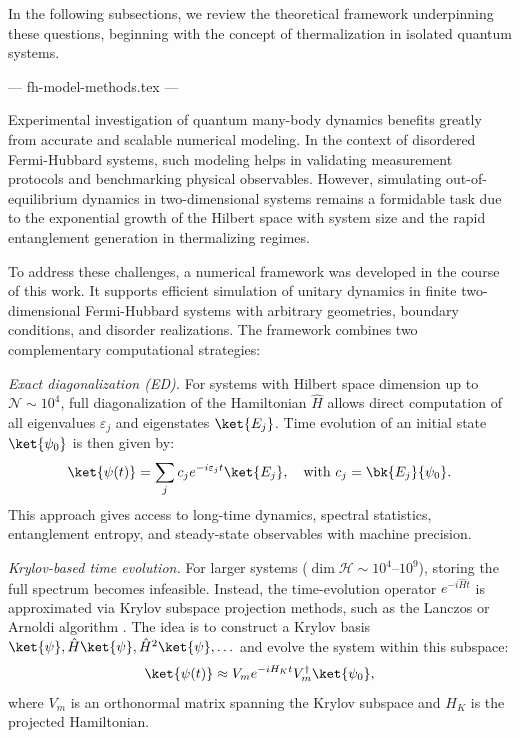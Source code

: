 In the following subsections, we review the theoretical framework underpinning these questions, beginning with the concept of thermalization in isolated quantum systems.



--- fh-model-methods.tex ---


Experimental investigation of quantum many-body dynamics benefits greatly from accurate and scalable numerical modeling. In the context of disordered Fermi-Hubbard systems, such modeling helps in validating measurement protocols and benchmarking physical observables. However, simulating out-of-equilibrium dynamics in two-dimensional systems remains a formidable task due to the exponential growth of the Hilbert space with system size and the rapid entanglement generation in thermalizing regimes.

To address these challenges, a numerical framework was developed in the course of this work. It supports efficient simulation of unitary dynamics in finite two-dimensional Fermi-Hubbard systems with arbitrary geometries, boundary conditions, and disorder realizations. The framework combines two complementary computational strategies:

\textit{Exact diagonalization (ED).}
For systems with Hilbert space dimension up to $\mathcal{N} \sim 10^4$, full diagonalization of the Hamiltonian $\hat{H}$ allows direct computation of all eigenvalues ${\varepsilon_j}$ and eigenstates ${\ket{E_j}}$. Time evolution of an initial state $\ket{\psi_0}$ is then given by:
\begin{equation}
\ket{\psi(t)} = \sum_j c_j e^{-i \varepsilon_j t} \ket{E_j}, \quad \text{with } c_j = \bk{E_j}{\psi_0}.
\end{equation}
This approach gives access to long-time dynamics, spectral statistics, entanglement entropy, and steady-state observables with machine precision. 

\textit{Krylov-based time evolution.}
For larger systems ($\dim \mathcal{H} \sim 10^4$–$10^9$), storing the full spectrum becomes infeasible. Instead, the time-evolution operator $e^{-i \hat{H} t}$ is approximated via Krylov subspace projection methods, such as the Lanczos or Arnoldi algorithm \cite{saad_analysis_1992,hochbruck_krylov_1997}. The idea is to construct a Krylov basis ${ \ket{\psi}, \hat{H} \ket{\psi}, \hat{H}^2 \ket{\psi}, \ldots }$ and evolve the system within this subspace:
\begin{equation}
\ket{\psi(t)} \approx V_m e^{-i H_K t} V_m^\dagger \ket{\psi_0},
\end{equation}
where $V_m$ is an orthonormal matrix spanning the Krylov subspace and $H_K$ is the projected Hamiltonian. 


